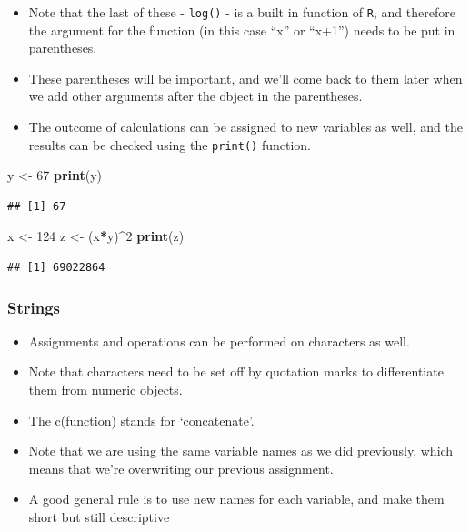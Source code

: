 \documentclass[]{book}
\newenvironment{Shaded}{\begin{snugshade}}{\end{snugshade}}
\newcommand{\DecValTok}[1]{\textcolor[rgb]{0.00,0.00,0.81}{#1}}
\newcommand{\KeywordTok}[1]{\textcolor[rgb]{0.13,0.29,0.53}{\textbf{#1}}}
\newcommand{\NormalTok}[1]{#1}
\newcommand{\OperatorTok}[1]{\textcolor[rgb]{0.81,0.36,0.00}{\textbf{#1}}}
\newcommand{\StringTok}[1]{\textcolor[rgb]{0.31,0.60,0.02}{#1}}
\begin{document}
\begin{itemize}
\item
  Note that the last of these - \texttt{log()} - is a built in function of \texttt{R}, and therefore the argument for the function (in this case ``x'' or ``x+1'') needs to be put in parentheses.
\item
  These parentheses will be important, and we'll come back to them later when we add other arguments after the object in the parentheses.
\item
  The outcome of calculations can be assigned to new variables as well, and the results can be checked using the \texttt{print()} function.
\end{itemize}

\begin{Shaded}
\begin{Highlighting}[]
\NormalTok{y <-}\StringTok{ }\DecValTok{67}
\KeywordTok{print}\NormalTok{(y)}
\end{Highlighting}
\end{Shaded}

\begin{verbatim}
## [1] 67
\end{verbatim}

\begin{Shaded}
\begin{Highlighting}[]
\NormalTok{x <-}\StringTok{ }\DecValTok{124}
\NormalTok{z <-}\StringTok{ }\NormalTok{(x}\OperatorTok{*}\NormalTok{y)}\OperatorTok{^}\DecValTok{2}
\KeywordTok{print}\NormalTok{(z)}
\end{Highlighting}
\end{Shaded}

\begin{verbatim}
## [1] 69022864
\end{verbatim}

\hypertarget{strings}{%
\subsubsection{Strings}\label{strings}}

\begin{itemize}
\item
  Assignments and operations can be performed on characters as well.
\item
  Note that characters need to be set off by quotation marks to differentiate them from numeric objects.
\item
  The c(function) stands for `concatenate'.
\item
  Note that we are using the same variable names as we did previously, which means that we're overwriting our previous assignment.
\item
  A good general rule is to use new names for each variable, and make them short but still descriptive
\end{itemize}
\end{document}
